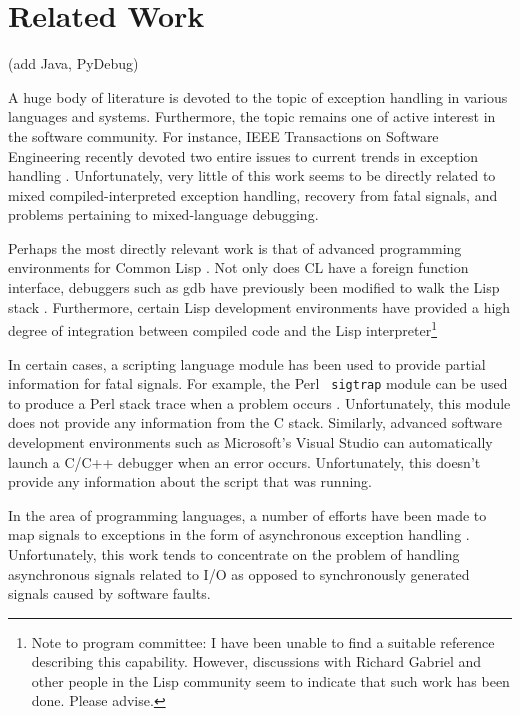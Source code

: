 \section{Related Work}

(add Java, PyDebug)

A huge body of literature is devoted to the topic of exception
handling in various languages and systems.  Furthermore, the topic
remains one of active interest in the software community. For
instance, IEEE Transactions on Software Engineering recently devoted
two entire issues to current trends in exception handling
\cite{except1,except2}.  Unfortunately, very little of this work seems
to be directly related to mixed compiled-interpreted exception
handling, recovery from fatal signals, and problems pertaining to 
mixed-language debugging.

Perhaps the most directly relevant work is that of advanced programming 
environments for Common Lisp \cite{lisp}.  Not only does CL have a foreign function interface,
debuggers such as gdb have previously been modified to walk the Lisp stack
\cite{ffi,wcl}.  Furthermore, certain Lisp development environments have
provided a high degree of integration between compiled code and
the Lisp interpreter\footnote{Note to program committee: I
have been unable to find a suitable reference describing this capability.  However,
discussions with Richard Gabriel and other people in the Lisp community seem to indicate that
such work has been done. Please advise.}

In certain cases, a scripting language module has been used to provide
partial information for fatal signals. For example, the Perl {\tt
sigtrap} module can be used to produce a Perl stack trace when a
problem occurs \cite{perl}.  Unfortunately, this module does not
provide any information from the C stack.   Similarly, advanced software development
environments such as Microsoft's Visual Studio can automatically launch a C/C++ 
debugger when an error occurs.  Unfortunately, this doesn't provide any information
about the script that was running.

In the area of programming languages, a number of efforts have been made to
map signals to exceptions in the form of asynchronous exception handling 
\cite{buhr,ml,haskell}.  Unfortunately, this work tends to 
concentrate on the problem of handling asynchronous signals related to I/O as opposed
to synchronously generated signals caused by software faults.

